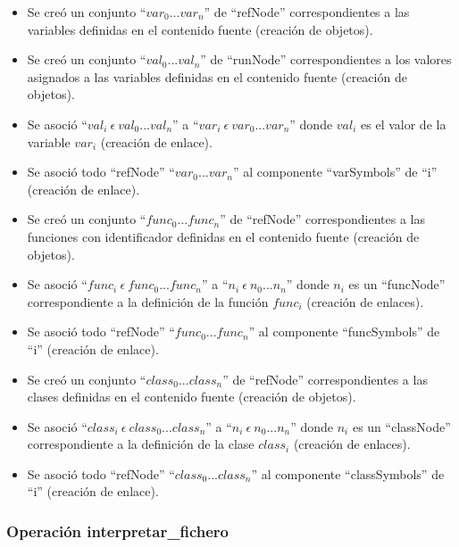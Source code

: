 \begin{description}
\begin {itemize}
         \item Se creó un conjunto ``$var_0...var_n$'' de ``refNode'' correspondientes a las variables definidas en el contenido fuente (creación de objetos).
         \item Se creó un conjunto ``$val_0...val_n$'' de ``runNode'' correspondientes a los valores asignados a las variables definidas en el contenido fuente (creación de objetos).
         \item Se asoció ``$val_i\ \epsilon\ val_0...val_n$'' a  ``$var_i\ \epsilon\ var_0...var_n$'' donde $val_i$ es el valor de la variable $var_i$ (creación de enlace). 
         \item Se asoció todo ``refNode'' ``$var_0...var_n$'' al componente ``varSymbols'' de ``i'' (creación de enlace). 
         \item Se creó un conjunto ``$func_0...func_n$'' de ``refNode'' correspondientes a las funciones con identificador definidas en el contenido fuente (creación de objetos).
         \item Se asoció ``$func_i\ \epsilon\ func_0...func_n$'' a  ``$n_i\ \epsilon\ n_0...n_n$'' donde $n_i$ es un ``funcNode'' correspondiente a la definición de la función $func_i$ (creación de enlaces).
         \item Se asoció todo ``refNode'' ``$func_0...func_n$'' al componente ``funcSymbols'' de ``i'' (creación de enlace). 
         \item Se creó un conjunto ``$class_0...class_n$'' de ``refNode'' correspondientes a las clases definidas en el contenido fuente (creación de objetos).
         \item Se asoció ``$class_i\ \epsilon\ class_0...class_n$'' a  ``$n_i\ \epsilon\ n_0...n_n$'' donde $n_i$ es un ``classNode'' correspondiente a la definición de la clase $class_i$ (creación de enlaces).
         \item Se asoció todo ``refNode'' ``$class_0...class_n$'' al componente ``classSymbols'' de ``i'' (creación de enlace). 
      \end{itemize}
	\end{description}


\subsubsection{Operación interpretar\_fichero}

